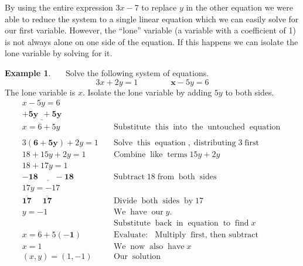 \documentclass[12pt]{book}
\theoremstyle{definition}
\newtheorem{example}{Example}
\newcommand{\tmmathbf}[1]{\ensuremath{\boldsymbol{#1}}}
\newcommand{\tmop}[1]{\ensuremath{\operatorname{#1}}}
\begin{document}
By using the entire expression $3 x - 7$ to replace $y$ in the other equation we were able to reduce the system to a single linear equation which we can
easily solve for our first variable. However, the ``lone'' variable (a variable with a coefficient of 1) is not always alone on one side of the equation. If
this happens we can isolate the lone variable by solving for it.
\begin{example}~~~Solve the following system of equations.
	$$3 x + 2 y = 1\qquad\qquad \tmmathbf{x} - 5 y = 6$$
    The lone variable is $x$.  Isolate the lone variable by adding $5y$ to both sides.
		\begin{eqnarray*}		
		x - 5 y = 6~~~~~~~ & & \\
		\tmmathbf{\underline{+ 5 y ~~+ 5 y}}~~~  &  & \\
	  x = 6 + 5 y &  & \tmop{Substitute} \tmop{this} \tmop{into} \tmop{the}
  		\tmop{untouched} \tmop{equation}\\
    	& & \\
  		3 \tmmathbf{(6 + 5 y)} + 2 y = 1 &  & \tmop{Solve} \tmop{this}
    \tmop{equation}, \tmop{distributing} 3 \tmop{first}\\
    18 + 15 y + 2 y = 1 &  & \tmop{Combine} \tmop{like} \tmop{terms} 15 y + 2
    y\\
			18 + 17 y = 1~~~~ &  &\\
    \tmmathbf{\underline{- 18 ~~~~~~~~~- 18}} &  & \tmop{Subtract} 18 \tmop{from} \tmop{both}
    \tmop{sides} \\
  		17 y = - 17 &  &\\
    \tmmathbf{\overline{17} ~~~~~~ \overline{17}} &  &  \tmop{Divide} \tmop{both} \tmop{sides} \tmop{by} 17\\
  	y = - 1 ~ &  & \tmop{We} \tmop{have} \tmop{our} y.\\
		& & \tmop{Substitute} \tmop{back} \tmop{in} \tmop{equation} \tmop{to} \tmop{find} x\\
    x = 6 + 5 \tmmathbf{(- 1)} &  & \tmop{Evaluate:} \tmop{~Multiply} \tmop{first,~then~subtract}\\
    x = 1~~~~~~~~~~~~ &  & \tmop{We} \tmop{now} \tmop{also} \tmop{have} x\\
    (x,y)=(1, - 1) &  & \tmop{Our} \tmop{solution}
  \end{eqnarray*}
\end{example}
\end{document}

